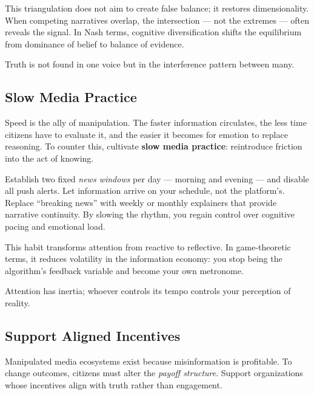 \documentclass[12pt,twoside]{book}
\begin{document}
This triangulation does not aim to create false balance; it restores dimensionality.  
When competing narratives overlap, the intersection --- not the extremes --- often reveals the signal.  
In Nash terms, cognitive diversification shifts the equilibrium from dominance of belief to balance of evidence.  \\

\begin{keyidea}
Truth is not found in one voice but in the interference pattern between many.
\end{keyidea}

\subsection*{Slow Media Practice}

Speed is the ally of manipulation.  
The faster information circulates, the less time citizens have to evaluate it, and the easier it becomes for emotion to replace reasoning.  
To counter this, cultivate \textbf{slow media practice}: reintroduce friction into the act of knowing.

Establish two fixed \emph{news windows} per day --- morning and evening --- and disable all push alerts.  
Let information arrive on your schedule, not the platform’s.  
Replace “breaking news” with weekly or monthly explainers that provide narrative continuity.  
By slowing the rhythm, you regain control over cognitive pacing and emotional load.

This habit transforms attention from reactive to reflective.  
In game-theoretic terms, it reduces volatility in the information economy: you stop being the algorithm’s feedback variable and become your own metronome. \\

\begin{keyidea}
Attention has inertia; whoever controls its tempo controls your perception of reality.
\end{keyidea}

\subsection*{Support Aligned Incentives}

Manipulated media ecosystems exist because misinformation is profitable.  
To change outcomes, citizens must alter the \emph{payoff structure}.  
Support organizations whose incentives align with truth rather than engagement.
\end{document}
